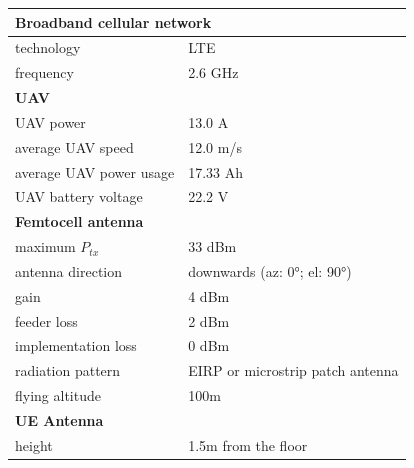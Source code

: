 \begin{table}[!htb]
\centering
\begin{tabular}[t]{ll}
        \toprule
        \multicolumn{2}{l}{\textbf{Broadband cellular network}} \\
        \hline
        \hspace{3mm}  technology        & LTE     \\
        \hspace{3mm}  frequency         & 2.6 GHz \\
        \hline
        \multicolumn{2}{l}{\textbf{UAV}} \\
        \hline  
        \hspace{3mm}  UAV power        & 13.0 A   \\
        \hspace{3mm}  average UAV speed        & 12.0 m/s \\
        \hspace{3mm}  average UAV power usage      & 17.33 Ah    \\
        \hspace{3mm}  UAV battery voltage       & 22.2 V \\
        \hline
        \multicolumn{2}{l}{\textbf{Femtocell antenna}} \\
        \hline  
        \hspace{3mm}  maximum $P_{tx}$          & 33 dBm   \\
        \hspace{3mm}  antenna  direction        & downwards (az: \ang{0}; el: \ang{90})    \\ 
        \hspace{3mm}  gain                      & 4 dBm   \\ 
        \hspace{3mm}  feeder loss               & 2 dBm   \\ 
        \hspace{3mm}  implementation loss       & 0 dBm   \\
        \hspace{3mm}  radiation pattern         & \acs{EIRP} or microstrip patch antenna\\
        \hspace{3mm}  flying altitude           & 100m  \\
        \hline
        \multicolumn{2}{l}{\textbf{\acs{UE} Antenna}} \\
        \hline 
        \hspace{3mm} height                     & 1.5m from the floor       \\ 

\end{tabular}
\end{table}
